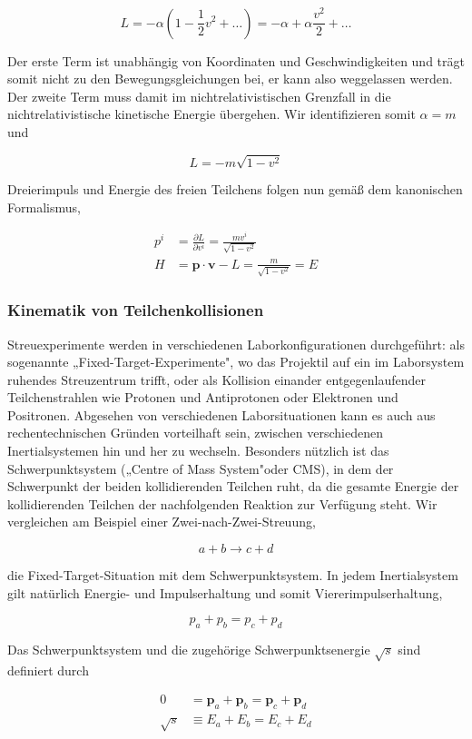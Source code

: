 \documentclass[10pt, letterpaper]{article}
\begin{document}
$$
L=-\alpha\left(1-\frac{1}{2} v^{2}+\ldots\right)=-\alpha+\alpha \frac{v^{2}}{2}+\ldots
$$

Der erste Term ist unabhängig von Koordinaten und Geschwindigkeiten und trägt somit nicht zu den Bewegungsgleichungen bei, er kann also weggelassen werden. Der zweite Term muss damit im nichtrelativistischen Grenzfall in die nichtrelativistische kinetische Energie übergehen. Wir identifizieren somit $\alpha=m$ und

$$
L=-m \sqrt{1-v^{2}}
$$

Dreierimpuls und Energie des freien Teilchens folgen nun gemäß dem kanonischen Formalismus,

$$
\begin{aligned}
p^{i} & =\frac{\partial L}{\partial v^{i}}=\frac{m v^{i}}{\sqrt{1-v^{2}}} \\
H & =\mathbf{p} \cdot \mathbf{v}-L=\frac{m}{\sqrt{1-v^{2}}}=E
\end{aligned}
$$

\subsubsection*{Kinematik von Teilchenkollisionen}
Streuexperimente werden in verschiedenen Laborkonfigurationen durchgeführt: als sogenannte „Fixed-Target-Experimente", wo das Projektil auf ein im Laborsystem ruhendes Streuzentrum trifft, oder als Kollision einander entgegenlaufender Teilchenstrahlen wie Protonen und Antiprotonen oder Elektronen und Positronen. Abgesehen von verschiedenen Laborsituationen kann es auch aus rechentechnischen Gründen vorteilhaft sein, zwischen verschiedenen Inertialsystemen hin und her zu wechseln. Besonders nützlich ist das Schwerpunktsystem („Centre of Mass System"oder CMS), in dem der Schwerpunkt der beiden kollidierenden Teilchen ruht, da die gesamte Energie der kollidierenden Teilchen der nachfolgenden Reaktion zur Verfügung steht. Wir vergleichen am Beispiel einer Zwei-nach-Zwei-Streuung,

$$
a+b \longrightarrow c+d
$$

die Fixed-Target-Situation mit dem Schwerpunktsystem. In jedem Inertialsystem gilt natürlich Energie- und Impulserhaltung und somit Viererimpulserhaltung,

$$
p_{a}+p_{b}=p_{c}+p_{d}
$$

Das Schwerpunktsystem und die zugehörige Schwerpunktsenergie $\sqrt{s}$ sind definiert durch

$$
\begin{aligned}
0 & =\mathbf{p}_{a}+\mathbf{p}_{b}=\mathbf{p}_{c}+\mathbf{p}_{d} \\
\sqrt{s} & \equiv E_{a}+E_{b}=E_{c}+E_{d}
\end{aligned}
$$
\end{document}
